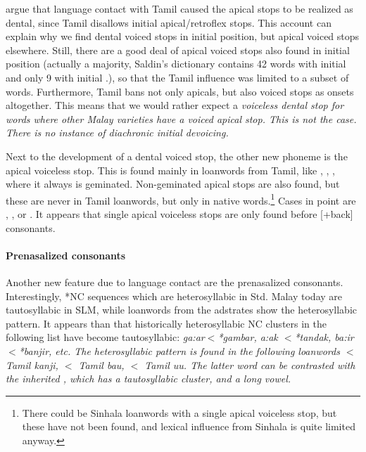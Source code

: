 \citep{SmithEtAl2004}  argue that language contact with Tamil caused the apical stops to be realized as dental, since Tamil disallows initial apical/retroflex stops. This account can explain why we find dental voiced stops in initial position, but apical voiced stops elsewhere. Still, there are a good deal of apical voiced stops also found in initial position (actually a majority, Saldin's dictionary \citep{Saldin2007Dico} contains 42 words with initial \graphem{\dz} and only 9 with initial \graphem{\dentd}.), so that the Tamil influence was limited to a subset of words. Furthermore, Tamil bans not only apicals, but also voiced stops as onsets altogether. This means that we would rather expect a \em voiceless \em dental stop for words where other Malay varieties have a voiced apical stop. This is not the case. There is no instance of diachronic initial devoicing.

Next to the development of a dental voiced stop, the other new phoneme is the apical voiceless stop. This is found mainly in loanwords from Tamil, like , , , where it always is geminated. Non-geminated apical stops are also found, but these are never in Tamil loanwords, but only in native words.\footnote{There could be Sinhala loanwords with a single apical voiceless stop, but these have not been found, and lexical influence from Sinhala is quite limited anyway.} Cases in point are , ,  or . It appears that single apical voiceless stops are only found before [+back] consonants.
 

\paragraph{Prenasalized consonants}\label{sec:phon:hist:prenasalizedconsonants}
Another new feature due to language contact are the prenasalized consonants. Interestingly, *NC sequences which are heterosyllabic in Std. Malay today are  tautosyllabic in SLM, while loanwords from the adstrates show the heterosyllabic pattern.
It appears than that historically heterosyllabic NC clusters in the following list have become tautosyllabic:
\em ga:\mb ar$<$*gambar,
\dentt a:\ndz ak $<$*tandak,
ba:\nJ ir$<$*banjir\em, etc.
The heterosyllabic pattern is found in the following loanwords
$<$ Tamil \em kanji\em,
$<$ Tamil \em ba\nz\dz u\em,
$<$ Tamil \em \dentt u\nz\dz u\em.
The latter word can be contrasted with the inherited , which has a tautosyllabic cluster, and a long vowel.

